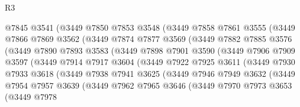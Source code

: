 \begin{lexlean}{R3}
\begin{coremodule}
                @7845
                @3541
                (@3449
                  @7850
                  @7853
                  @3548
                  (@3449
                    @7858
                    @7861
                    @3555
                    (@3449
                      @7866
                      @7869
                      @3562
                      (@3449
                        @7874
                        @7877
                        @3569
                        (@3449
                          @7882
                          @7885
                          @3576
                          (@3449
                            @7890
                            @7893
                            @3583
                            (@3449
                              @7898
                              @7901
                              @3590
                              (@3449
                                @7906
                                @7909
                                @3597
                                (@3449
                                  @7914
                                  @7917
                                  @3604
                                  (@3449
                                    @7922
                                    @7925
                                    @3611
                                    (@3449
                                      @7930
                                      @7933
                                      @3618
                                      (@3449
                                        @7938
                                        @7941
                                        @3625
                                        (@3449
                                          @7946
                                          @7949
                                          @3632
                                          (@3449
                                            @7954
                                            @7957
                                            @3639
                                            (@3449
                                              @7962
                                              @7965
                                              @3646
                                              (@3449
                                                @7970
                                                @7973
                                                @3653
                                                (@3449
                                                  @7978

\end{coremodule}
\end{lexlean}

